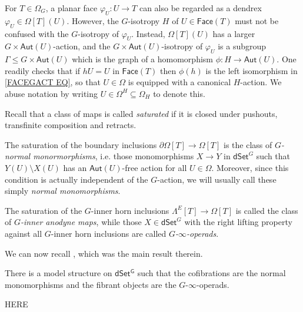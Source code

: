 \documentclass[a4paper,10pt,draft]{article}%
\begin{document}
\begin{remark}\label{FACEGACT REM}
	For $T \in \Omega_G$, a planar face $\varphi_U \colon U \to T$
	can also be regarded as a dendrex $\varphi_U \in \Omega[T](U)$.
	However, the $G$-isotropy $H$ of $U \in \mathsf{Face}(T)$ must not be confused with the $G$-isotropy of $\varphi_U$.
	Instead, $\Omega[T](U)$ has a larger $G \times \mathsf{Aut}(U)$-action,
	and the $G \times \mathsf{Aut}(U)$-isotropy of $\varphi_U$
	is a subgroup 
	$\Gamma \leq G \times \mathsf{Aut}(U)$
	which is the graph of a homomorphism
	$\phi\colon H \to \mathsf{Aut}(U)$.
	One readily checks that if $hU = U$ in $\mathsf{Face}(T)$ then
	$\phi(h)$ is the left isomorphism in \eqref{FACEGACT EQ},
	so that $U\in \Omega$ is equipped with a canonical $H$-action.
	We abuse notation by writing 
	$U \in \Omega^H \subseteq \Omega_H$ to denote this.  
\end{remark}

Recall that a class of maps is called \textit{saturated} if it is closed under pushouts, transfinite composition and retracts. 

The saturation of the boundary inclusions 
$\partial \Omega[T] \to \Omega[T]$
is the class of \textit{$G$-normal monormorphisms},
i.e. those monomorphisms $X \to Y$ in $\mathsf{dSet}^G$ such that
$Y(U) \setminus X(U)$ has an $\mathsf{Aut}(U)$-free action for all $U \in \Omega$. 
Moreover, since this condition is actually independent of the $G$-action, we will usually call these simply \textit{normal monomorphisms}.

The saturation of the $G$-inner horn inclusions 
$\Lambda^E[T] \to \Omega[T]$
is called the class of \textit{$G$-inner anodyne maps}, 
while those $X \in \mathsf{dSet}^G$
with the right lifting property against all $G$-inner horn inclusions are called \textit{$G$-$\infty$-operads}.

We can now recall \cite[Thm 2.1]{Per17}, which was the main result therein.

\begin{theorem}
	There is a model structure on $\mathsf{dSet^G}$
	such that the cofibrations are the normal monomorphisms and the fibrant objects are the $G$-$\infty$-operads.
\end{theorem}

{\color{red} HERE}
\end{document}
